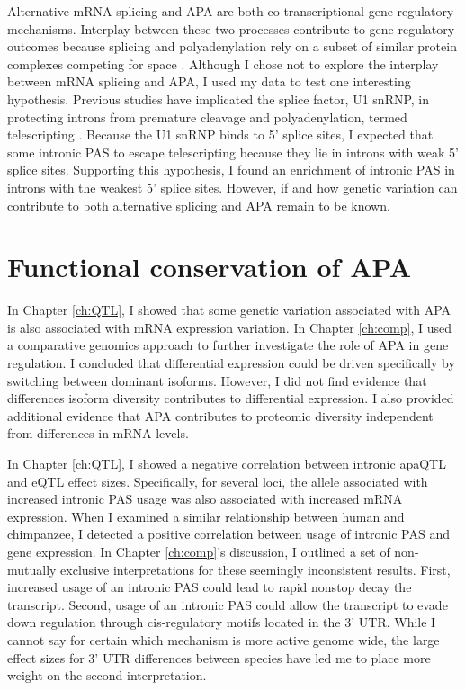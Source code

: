 Alternative mRNA splicing and APA are both co-transcriptional gene regulatory mechanisms. Interplay between these two processes contribute to gene regulatory outcomes because splicing and polyadenylation rely on a subset of similar protein complexes competing for space \citep{proudfoot_integrating_2002}. Although I chose not to explore the interplay between mRNA splicing and APA, I used my data to test one interesting hypothesis. Previous studies have implicated the splice factor, U1 snRNP, in protecting introns from premature cleavage and polyadenylation, termed telescripting \citep{kaida_u1_2010, berg_u1_2012, oh_u1_2017}.  Because the U1 snRNP binds to 5' splice sites, I expected that some intronic PAS to escape telescripting because they lie in introns with weak 5' splice sites. Supporting this hypothesis, I found an enrichment of intronic PAS in introns with the weakest 5' splice sites. However, if and how genetic variation can contribute to both alternative splicing and APA remain to be known.





\section{Functional conservation of APA }

In Chapter \ref{ch:QTL}, I showed that some genetic variation associated with APA is also associated with mRNA expression variation. In Chapter \ref{ch:comp}, I used a comparative genomics approach to further investigate the role of APA in gene regulation. I concluded that differential expression could be driven specifically by switching between dominant isoforms. However, I did not find evidence that differences isoform diversity contributes to differential expression. I also provided additional evidence that APA contributes to proteomic diversity independent from differences in mRNA levels. 

In Chapter \ref{ch:QTL}, I showed a negative correlation between intronic apaQTL and eQTL effect sizes. Specifically, for several loci, the allele associated with increased intronic PAS usage was also associated with increased mRNA expression. When I examined a similar relationship between human and chimpanzee, I detected a positive correlation between usage of intronic PAS and gene expression. In Chapter \ref{ch:comp}'s discussion, I outlined a set of non-mutually exclusive interpretations for these seemingly inconsistent results. First, increased usage of an intronic PAS could lead to rapid nonstop decay the transcript. Second, usage of an intronic PAS could allow the transcript to evade down regulation through cis-regulatory motifs located in the 3' UTR. While I cannot say for certain which mechanism is more active genome wide, the large effect sizes for 3' UTR differences between species have led me to place more weight on the second interpretation.  

